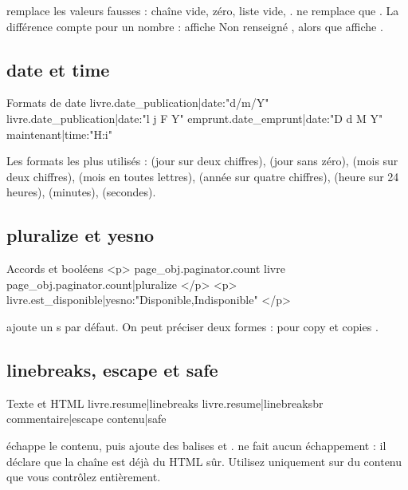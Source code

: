  remplace les valeurs fausses : chaîne vide, zéro, liste vide,
.  ne remplace que . La différence
compte pour un nombre :  affiche
\og Non renseigné \fg, alors que 
affiche .

\subsection{date et time}

\begin{codebox}[html]{Formats de date}
{{ livre.date_publication|date:"d/m/Y" }}
{{ livre.date_publication|date:"l j F Y" }}
{{ emprunt.date_emprunt|date:"D d M Y" }}
{{ maintenant|time:"H:i" }}
\end{codebox}

Les formats les plus utilisés :  (jour sur deux chiffres), 
(jour sans zéro),  (mois sur deux chiffres),  (mois en toutes
lettres),  (année sur quatre chiffres),  (heure sur 24 heures),
 (minutes),  (secondes).

\subsection{pluralize et yesno}

\begin{codebox}[html]{Accords et booléens}
<p>
  {{ page_obj.paginator.count }} livre{{ page_obj.paginator.count|pluralize }}
</p>
<p>{{ livre.est_disponible|yesno:"Disponible,Indisponible" }}</p>
\end{codebox}

 ajoute un \og s \fg{} par défaut. On peut préciser deux formes :
 pour \og copy \fg{} et \og copies \fg.

\subsection{linebreaks, escape et safe}

\begin{codebox}[html]{Texte et HTML}
{{ livre.resume|linebreaks }}
{{ livre.resume|linebreaksbr }}
{{ commentaire|escape }}
{{ contenu|safe }}
\end{codebox}

\begin{attention}
 échappe le contenu, puis ajoute des balises  et
.  ne fait aucun échappement : il déclare que la chaîne est
déjà du HTML sûr. Utilisez  uniquement sur du contenu que vous
contrôlez entièrement.
\end{attention}

